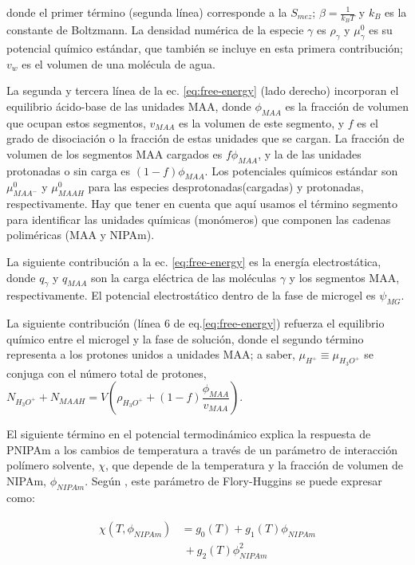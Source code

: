 \noindent donde el primer t\'ermino (segunda l\'inea) corresponde a la  $S_{mez}$; $\beta=\frac{1}{k_BT}$ y $k_B$ es la constante de Boltzmann.
La densidad num\'erica de la especie $\gamma$ es $\rho_\gamma$ y $\mu^0_\gamma$ es su potencial qu\'imico est\'andar, que tambi\'en se incluye en esta primera contribuci\'on; $v_w$ es el volumen de una mol\'ecula de agua.


La segunda y tercera l\'inea de la ec. \ref{eq:free-energy} (lado derecho) incorporan el equilibrio \'acido-base de las unidades MAA, donde $\phi_{MAA}$ es la fracci\'on de volumen que ocupan estos segmentos, $v_{MAA}$ es la volumen de este segmento, y $f$ es el grado de disociaci\'on o la fracci\'on de estas unidades que se cargan.
La fracci\'on de volumen de los segmentos MAA cargados es $f\phi_{MAA}$, y la de las unidades protonadas o sin carga es $(1-f)\phi_{MAA}$.
Los potenciales qu\'imicos est\'andar son $\mu^0_{MAA^-}$ y $\mu^0_{MAAH}$ para las especies desprotonadas(cargadas) y protonadas, respectivamente.
Hay que tener en cuenta que aqu\'i usamos el t\'ermino segmento para identificar las unidades qu\'imicas (monómeros) que componen las cadenas polim\'ericas (MAA y NIPAm).


La siguiente contribuci\'on a la ec. \ref{eq:free-energy} es la energ\'ia electrost\'atica, donde $q_\gamma$ y $q_{MAA}$ son la carga el\'ectrica de las moléculas $\gamma$ y los segmentos MAA, respectivamente.
El potencial electrost\'atico dentro de la fase de microgel es $\psi_{MG}$.


La siguiente contribución (l\'inea 6 de eq.\ref{eq:free-energy}) refuerza el equilibrio qu\'imico entre el microgel y la fase de soluci\'on, donde el segundo t\'ermino representa a los protones unidos a unidades MAA;
a saber, $\mu_{H^+}\equiv\mu_{H_3O^+}$ se conjuga con el n\'umero total de protones,
$N_{H_3O^+}+N_{MAAH}=V\left(\rho_{H_3O^+}+(1-f)\dfrac{\phi_{MAA}}{v_{MAA}}\right)$.


El siguiente t\'ermino en el potencial termodin\'amico explica la respuesta de PNIPAm a los cambios de temperatura a trav\'es de un par\'ametro de interacci\'on pol\'imero solvente, $\chi$, que depende de la temperatura y la fracci\'on de volumen de NIPAm, $\phi_{NIPAm}$.
Seg\'un  \cite{afroze2000}, este par\'ametro de Flory-Huggins se puede expresar como:
%
%


\begin{align}
\begin{aligned}
\chi (T, \phi_{NIPAm}) &=g_0(T) +g_1(T)\phi_{NIPAm} \\
 &~+ g_2(T)\phi_{NIPAm}^2
\end{aligned}
\end{align}

